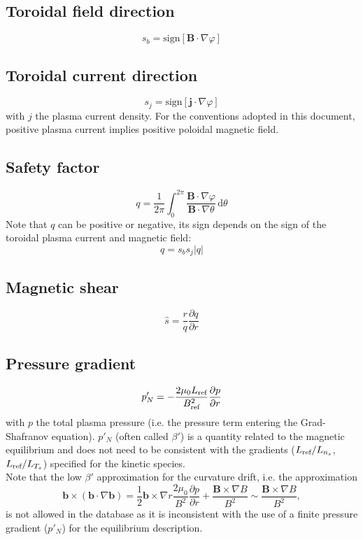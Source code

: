\documentclass[fleqn]{report}
\begin{document}

\subsection{Toroidal field direction}
$$s_b = \textrm{sign}[\mathbf{B}\cdot\nabla\varphi]$$

\subsection{Toroidal current direction}
$$s_j = \textrm{sign}[\mathbf{j}\cdot\nabla\varphi]$$
with $j$ the plasma current density. For the conventions adopted in this document, positive plasma current implies positive poloidal magnetic field.

\subsection{Safety factor}
$$q=\frac{1}{2\pi}\int_0^{2\pi} \frac{\mathbf{B}\cdot\nabla \varphi}{\mathbf{B}\cdot\nabla \theta}\,\textrm{d}\theta$$
Note that $q$ can be positive or negative, its sign depends on the sign of the toroidal plasma current and magnetic field:
$$q = s_b s_j |q|$$

\subsection{Magnetic shear}
$$\hat{s}=\frac{r}{q}\frac{\partial q}{\partial r}$$


\subsection{Pressure gradient}
$$p'_N = -\frac{2\mu_0 L_{\textrm{ref}}}{B_{\textrm{ref}}^2 }\frac{\partial p}{\partial r}$$
with $p$ the total plasma pressure (i.e. the pressure term entering the Grad-Shafranov equation). $p'_N$ (often called $\beta'$) is a quantity related to the magnetic equilibrium and does not need to be consistent with the gradients ($L_{\textrm{ref}}/L_{n_s}$, $L_{\textrm{ref}}/L_{T_s}$) specified for the kinetic species.\\
Note that the low $\beta'$ approximation for the curvature drift, i.e. the approximation
$$\mathbf{b}\times(\mathbf{b}\cdot\nabla\mathbf{b})=\frac{1}{2}\mathbf{b}\times\nabla r\frac{2\mu_0}{B^2}\frac{\partial p}{\partial r} + \frac{\mathbf{B}\times\nabla B}{B^2} \sim  \frac{\mathbf{B}\times\nabla B}{B^2}, $$
is not allowed in the database as it is inconsistent with the use of a finite pressure gradient ($p'_N$) for the equilibrium description. 
\end{document}
